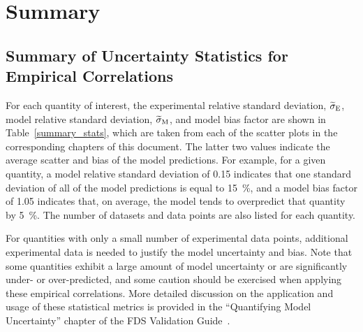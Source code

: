 
\chapter{Summary}
\label{Summary_Chapter}

\section*{Summary of Uncertainty Statistics for Empirical Correlations}

For each quantity of interest, the experimental relative standard deviation, $\widetilde{\sigma}\sb{E}$, model relative standard deviation, $\widetilde{\sigma}\sb{M}$, and model bias factor are shown in Table~\ref{summary_stats}, which are taken from each of the scatter plots in the corresponding chapters of this document. The latter two values indicate the average scatter and bias of the model predictions. For example, for a given quantity, a model relative standard deviation of 0.15 indicates that one standard deviation of all of the model predictions is equal to 15~\%, and a model bias factor of 1.05 indicates that, on average, the model tends to overpredict that quantity by 5~\%. The number of datasets and data points are also listed for each quantity.

For quantities with only a small number of experimental data points, additional experimental data is needed to justify the model uncertainty and bias. Note that some quantities exhibit a large amount of model uncertainty or are significantly under- or over-predicted, and some caution should be exercised when applying these empirical correlations. More detailed discussion on the application and usage of these statistical metrics is provided in the ``Quantifying Model Uncertainty'' chapter of the FDS Validation Guide~\cite{FDS_Validation_Guide}.

